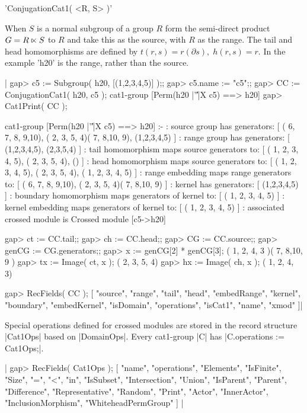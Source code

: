 %

'ConjugationCat1( <R, S> )'

When $S$ is a normal subgroup of a group $R$ form the semi-direct product  
$G = R \semidirect S$  to $R$ 
and take this as the source, with $R$ as the range.  
The tail and head homomorphisms are defined by
$t(r,s) = r(\partial s), \; h(r,s) = r$.
In the example 'h20' is the range, rather than the source.

|    gap> c5 := Subgroup( h20, [(1,2,3,4,5)] );;
    gap> c5.name := "c5";;
    gap> CC := ConjugationCat1( h20, c5 );
    cat1-group [Perm(h20 |'\|'|X c5) ==> h20] 
    gap> Cat1Print( CC );

    cat1-group [Perm(h20 |'\|'|X c5) ==> h20] :- 
    : source group has generators:
      [ ( 6, 7, 8, 9,10), ( 2, 3, 5, 4)( 7, 8,10, 9), (1,2,3,4,5) ]
    :  range group has generators:
      [ (1,2,3,4,5), (2,3,5,4) ]
    : tail homomorphism maps source generators to:
      [ ( 1, 2, 3, 4, 5), ( 2, 3, 5, 4), () ]
    : head homomorphism maps source generators to:
      [ ( 1, 2, 3, 4, 5), ( 2, 3, 5, 4), ( 1, 2, 3, 4, 5) ]
    : range embedding maps range generators to:
      [ ( 6, 7, 8, 9,10), ( 2, 3, 5, 4)( 7, 8,10, 9) ]
    : kernel has generators:
      [ (1,2,3,4,5) ]
    : boundary homomorphism maps generators of kernel to:
      [ ( 1, 2, 3, 4, 5) ]
    : kernel embedding maps generators of kernel to:
      [ ( 1, 2, 3, 4, 5) ]
    : associated crossed module is Crossed module [c5->h20]

    gap> ct := CC.tail;;
    gap> ch := CC.head;;
    gap> CG := CC.source;;
    gap> genCG := CG.generators;;
    gap> x := genCG[2] * genCG[3];
    ( 1, 2, 4, 3 )( 7, 8,10, 9 )
    gap> tx := Image( ct, x );
    ( 2, 3, 5, 4)
    gap> hx := Image( ch, x );
    ( 1, 2, 4, 3)
    
    gap> RecFields( CC );
    [ "source", "range", "tail", "head", "embedRange", "kernel", 
      "boundary", "embedKernel", "isDomain", "operations", "isCat1",
      "name", "xmod" ]|

%

Special operations defined for crossed modules are stored in the record
structure |Cat1Ops| based on |DomainOps|.
Every cat1-group |C| has |C.operations := Cat1Ops;|.

|    gap> RecFields( Cat1Ops );
    [ "name", "operations", "Elements", "IsFinite", "Size", "=", "<", 
      "in", "IsSubset", "Intersection", "Union", "IsParent", "Parent", 
      "Difference", "Representative", "Random", "Print", "Actor",
      "InnerActor", "InclusionMorphism", "WhiteheadPermGroup" ]  |

